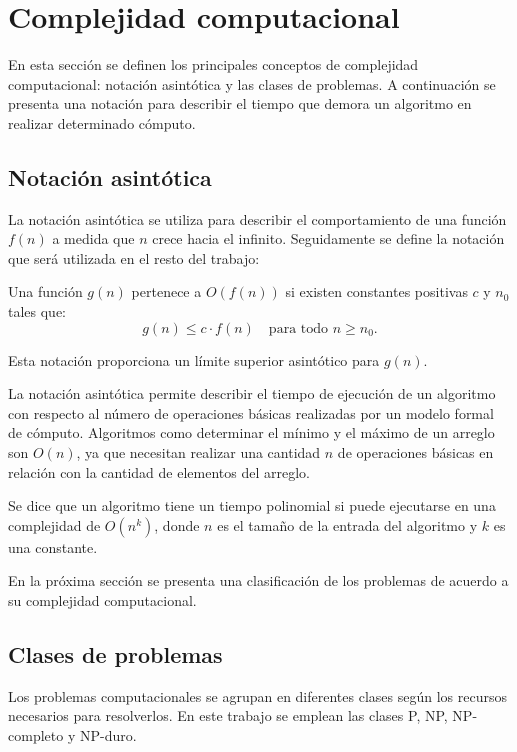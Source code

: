 \section{Complejidad computacional}

En esta sección se definen los principales conceptos de complejidad computacional: notación asintótica y las clases de problemas. A continuación se presenta una notación para describir el tiempo que demora un algoritmo en realizar determinado cómputo.

\subsection{Notación asintótica}

La notación asintótica se utiliza para describir el comportamiento de una función $f(n)$ a medida que $n$ crece hacia el infinito.  Seguidamente se define la notación que será utilizada en el resto del trabajo:

\begin{definition}
  Una función $g(n)$ pertenece a $O(f(n))$ si existen constantes positivas $c$ y $n_0$ tales que:
  \[
    g(n) \leq c \cdot f(n) \quad \text{para todo } n \geq n_0.
  \]
\end{definition}

Esta notación proporciona un límite superior asintótico para $g(n)$.

La notación asintótica permite describir el tiempo de ejecución de un algoritmo con respecto al número de 
operaciones básicas realizadas por un modelo formal de cómputo.  Algoritmos como determinar el mínimo y el 
máximo de un arreglo son $O(n)$, ya que necesitan realizar una cantidad $n$ de operaciones básicas en relación 
con la cantidad de elementos del arreglo.

Se dice que un algoritmo tiene un tiempo polinomial si puede ejecutarse en una complejidad de $O(n^k)$, donde $n$ es el tamaño de la entrada del algoritmo y $k$
es una constante. 

En la próxima sección se presenta una clasificación de los problemas de acuerdo a su complejidad computacional.
\subsection{Clases de problemas}

Los problemas computacionales \cite{authomataTheory} se agrupan en diferentes clases según los recursos 
necesarios para resolverlos. En este trabajo se emplean las clases P, NP, NP-completo y NP-duro.

